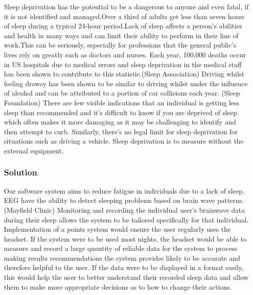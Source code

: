 Sleep deprivation has the potential to be a dangerous to anyone and
even fatal, if it is not identified and managed.Over a third of adults get less than seven hours
of sleep during a typical 24-hour period.Lack of sleep affects a person's abilities and health
in many ways and can limit their ability to perform in their line of work.This can be seriously,
especially for professions that the general public’s lives rely on greatly such as doctors and nurses.
Each year, 100,000 deaths occur in US hospitals due to medical errors and sleep deprivation in the
medical staff has been shown to contribute to this statistic.(Sleep Association) Driving whilst feeling drowsy
has been shown to be similar to driving whilst under the influence of alcohol and can be attributed to a
portion of car collisions each year. (Sleep Foundation) There are few visible indications that an individual
is getting less sleep than recommended and it’s difficult to know if you are deprived of sleep
which often makes it more damaging as it may be challenging to identify and then attempt to curb.
Similarly, there’s no legal limit for sleep deprivation for situations such as driving a vehicle.
Sleep deprivation is to measure without the external equipment.

\subsubsection{Solution}

Our software system aims to reduce fatigue in individuals due to a lack of sleep.
 EEG have the ability to detect sleeping problems based on brain wave patterns. (Mayfield Clinic)
 Monitoring and recording the individual user’s brainwave data during their sleep allows the system
 to be tailored specifically for that individual. Implementation of a points system would ensure the
 user regularly uses the headset. If the system were to be used most nights, the headset would be able
 to measure and record a large quantity of reliable data for the system to process making results
 recommendations the system provides likely to be accurate and therefore helpful to the user.
 If the data were to be displayed in a format easily, this would help the user
 to better understand their recorded sleep data and allow them to make more appropriate decisions as to
 how to change their actions.
